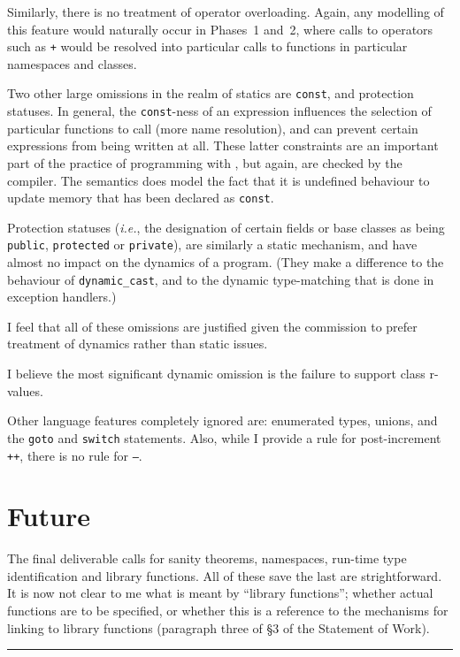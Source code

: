 \documentclass[11pt]{article}
\newcommand{\ie}{\emph{i.e.}}
\begin{document}
Similarly, there is no treatment of operator overloading.  Again, any
modelling of this feature would naturally occur in Phases~1 and~2,
where calls to operators such as \texttt{+} would be resolved into
particular calls to functions in particular namespaces and classes.

Two other large omissions in the realm of statics are \texttt{const},
and protection statuses.  In general, the \texttt{const}-ness of an
expression influences the selection of particular functions to call
(more name resolution), and can prevent certain expressions from being
written at all.  These latter constraints are an important part of the
practice of programming with \cpp{}, but again, are checked by the
compiler.  The semantics does model the fact that it is undefined
behaviour to update memory that has been declared as \texttt{const}.


Protection statuses (\ie, the designation of certain fields or base
classes as being \texttt{public}, \texttt{protected} or
\texttt{private}), are similarly a static mechanism, and have almost
no impact on the dynamics of a program.  (They make a difference to
the behaviour of \texttt{dynamic_cast}, and to the dynamic
type-matching that is done in exception handlers.)

I feel that all of these omissions are justified given the commission
to prefer treatment of dynamics rather than static issues.

I believe the most significant dynamic omission is the failure to
support class r-values.

Other language features completely ignored are: enumerated types,
unions, and the \texttt{goto} and \texttt{switch} statements.  Also,
while I provide a rule for post-increment \texttt{++}, there is no
rule for \texttt{--}.

\section{Future}

The final deliverable calls for sanity theorems, namespaces, run-time
type identification and library functions.  All of these save the last
are strightforward.  It is now not clear to me what is meant by
``library functions''; whether actual functions are to be specified,
or whether this is a reference to the mechanisms for linking to
library functions (paragraph three of \S3 of the Statement of Work).

\begin{center}
\rule{0.5\textwidth}{.1mm}
\end{center}
\end{document}
